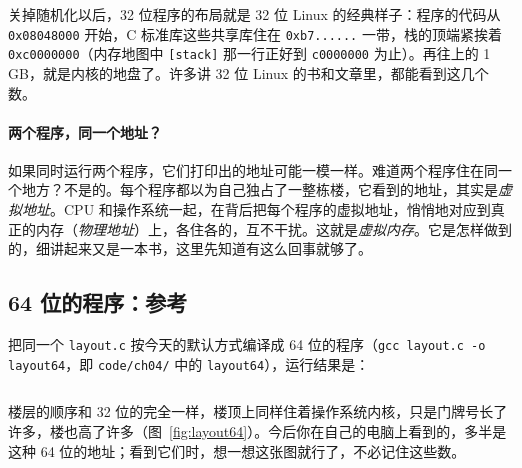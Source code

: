 关掉随机化以后，32 位程序的布局就是 32 位 Linux 的经典样子：程序的代码从 \texttt{0x08048000} 开始，C 标准库这些共享库住在 \texttt{0xb7......} 一带，栈的顶端紧挨着 \texttt{0xc0000000}（内存地图中 \texttt{[stack]} 那一行正好到 \texttt{c0000000} 为止）。再往上的 1\,GB，就是内核的地盘了。许多讲 32 位 Linux 的书和文章里，都能看到这几个数。

\paragraph{两个程序，同一个地址？}
如果同时运行两个程序，它们打印出的地址可能一模一样。难道两个程序住在同一个地方？不是的。每个程序都以为自己独占了一整栋楼，它看到的地址，其实是\emph{虚拟地址}。CPU 和操作系统一起，在背后把每个程序的虚拟地址，悄悄地对应到真正的内存（\emph{物理地址}）上，各住各的，互不干扰。这就是\emph{虚拟内存}。它是怎样做到的，细讲起来又是一本书，这里先知道有这么回事就够了。

\subsection{64 位的程序：参考}
\label{sec:layout64}

把同一个 \texttt{layout.c} 按今天的默认方式编译成 64 位的程序（\texttt{gcc layout.c -o layout64}，即 \texttt{code/ch04/} 中的 \texttt{layout64}），运行结果是：
\inputminted[linenos=false]{text}{code/ch04/out/layout64.txt}

楼层的顺序和 32 位的完全一样，楼顶上同样住着操作系统内核，只是门牌号长了许多，楼也高了许多（图~\ref{fig:layout64}）。今后你在自己的电脑上看到的，多半是这种 64 位的地址；看到它们时，想一想这张图就行了，不必记住这些数。

